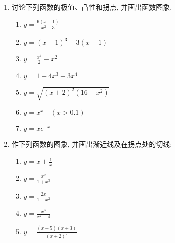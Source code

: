     
    
    \begin{ex}
    \begin{enumerate}
        \item 讨论下列函数的极值、凸性和拐点, 并画出函数图象.
    \begin{multicols}{2}
    \begin{enumerate}
    \item  $y=\frac{6(x-1)}{x^{2}+3}$
    \item  $y=(x-1)^{3}-3(x-1)$
    \item  $y=\frac{x^{4}}{2}-x^{2}$
    \item  $y=1+4 x^{3}-3 x^{4}$
    \item  $y=\sqrt{(x+2)^{2}\left(16-x^{2}\right)}$
    \item  $y=x^{x}\quad (x>0.1)$
    \item  $y=x e^{-x}$
    \end{enumerate}
    \end{multicols}
    
        \item 作下列函数的图象, 并画出渐近线及在拐点处的切线:
        \begin{multicols}{2}
            \begin{enumerate}
                \item $y=x+\frac{1}{x}$
                \item $y=\frac{x^{2}}{1+x^{3}}$
                \item $y=\frac{2 x}{1-x^{2}}$
                \item $y=\frac{x^{3}}{x^{2}-4}$
                \item $y=\frac{(x-5)(x+3)}{(x+2)^{2}}$
    \end{enumerate}
    \end{multicols}
    \end{enumerate}
    \end{ex}
    
